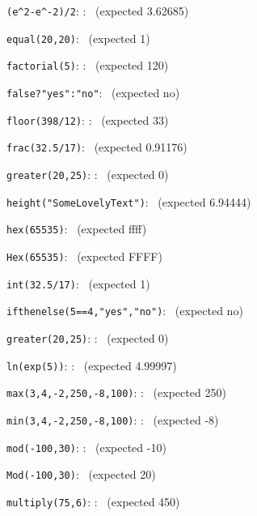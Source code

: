 \documentclass{article}
\begin{document}
\verb|(e^2-e^-2)/2|:
    :
   \pgfmathresult\ (expected  3.62685)

\verb|equal(20,20)|:
   \pgfmathresult\ (expected  1)

\verb|factorial(5)|:
    :
   \pgfmathresult\ (expected  120)

\verb|false?"yes":"no"|:
   \pgfmathresult\ (expected  no)

\verb|floor(398/12)|:
    :
   \pgfmathresult\ (expected  33)

\verb|frac(32.5/17)|:
   \pgfmathresult\ (expected  0.91176)

\verb|greater(20,25)|:
    :
   \pgfmathresult\ (expected  0)

\verb|height("SomeLovelyText")|:
   \pgfmathresult\ (expected  6.94444)

\verb|hex(65535)|:
   \pgfmathresult\ (expected  ffff)

\verb|Hex(65535)|:
   \pgfmathresult\ (expected  FFFF)

\verb|int(32.5/17)|:
   \pgfmathresult\ (expected  1)

\verb|ifthenelse(5==4,"yes","no")|:
   \pgfmathresult\ (expected  no)

\verb|greater(20,25)|:
    :
   \pgfmathresult\ (expected  0)

\verb|ln(exp(5))|:
    :
   \pgfmathresult\ (expected  4.99997)

\verb|max(3,4,-2,250,-8,100)|:
    :
   \pgfmathresult\ (expected  250)

\verb|min(3,4,-2,250,-8,100)|:
    :
   \pgfmathresult\ (expected  -8)

\verb|mod(-100,30)|:
    :
   \pgfmathresult\ (expected  -10)

\verb|Mod(-100,30)|:
   \pgfmathresult\ (expected  20)

\verb|multiply(75,6)|:
    :
   \pgfmathresult\ (expected  450)
\end{document}

